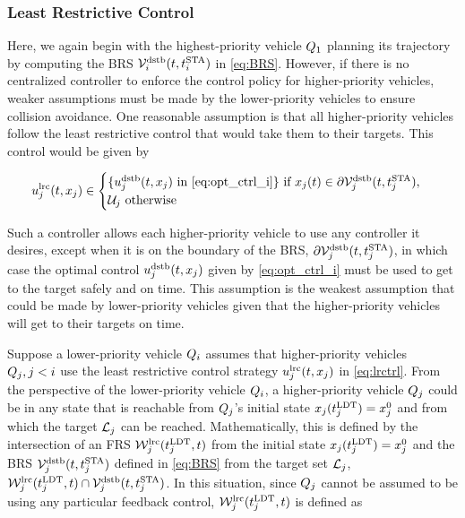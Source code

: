 \subsubsection{Least Restrictive Control\label{sec:lrc}}
Here, we again begin with the highest-priority vehicle $Q_1$ planning its trajectory by computing the BRS $\mathcal{V}_i^\text{dstb}(t, t^\text{STA}_i)$ in \eqref{eq:BRS}. However, if there is no centralized controller to enforce the control policy for higher-priority vehicles, weaker assumptions must be made by the lower-priority vehicles to ensure collision avoidance. One reasonable assumption is that all higher-priority vehicles follow the least restrictive control that would take them to their targets. This control would be given by 

\begin{equation}
\label{eq:lrctrl} %
\ctrl_j^\text{lrc}(t, \state_j)\in \begin{cases} \{\ctrl_j^\text{dstb}(t, \state_j) \text{ in } \eqref{eq:opt_ctrl_i}\} \text{ if } \state_j(t)\in \partial \brs_j^\text{dstb}(t, \sta_j), \\
\cset_j  \text{ otherwise}
\end{cases}
\end{equation}

Such a controller allows each higher-priority vehicle to use any controller it desires, except when it is on the boundary of the BRS, $\partial \mathcal{V}_j^\text{dstb}(t, t^\text{STA}_j)$, in which case the optimal control $u_j^\text{dstb}(t, x_j)$ given by \eqref{eq:opt_ctrl_i} must be used to get to the target safely and on time. This assumption is the weakest assumption that could be made by lower-priority vehicles given that the higher-priority vehicles will get to their targets on time.

Suppose a lower-priority vehicle $Q_i$ assumes that higher-priority vehicles $Q_j, j < i$ use the least restrictive control strategy $u_j^\text{lrc}(t, x_j)$ in \eqref{eq:lrctrl}. From the perspective of the lower-priority vehicle $Q_i$, a higher-priority vehicle $Q_j$ could be in any state that is reachable from $Q_j$'s initial state $x_j(t^\text{LDT}_j) = x_{j}^0$ and from which the target $\mathcal{L}_j$ can be reached. Mathematically, this is defined by the intersection of an FRS $\mathcal{W}_j^\text{lrc}(t^\text{LDT}_j, t)$ from the initial state $x_j(t^\text{LDT}_j)=x_{j}^0$ and the BRS $\mathcal{V}_j^\text{dstb}(t, t^\text{STA}_j)$ defined in \eqref{eq:BRS} from the target set $\mathcal{L}_j$, $\mathcal{W}_j^\text{lrc}(t^\text{LDT}_j, t) \cap \mathcal{V}_j^\text{dstb}(t, t^\text{STA}_j)$. In this situation, since $Q_j$ cannot be assumed to be using any particular feedback control, $\mathcal{W}_j^\text{lrc}(t^\text{LDT}_j, t)$ is defined as

